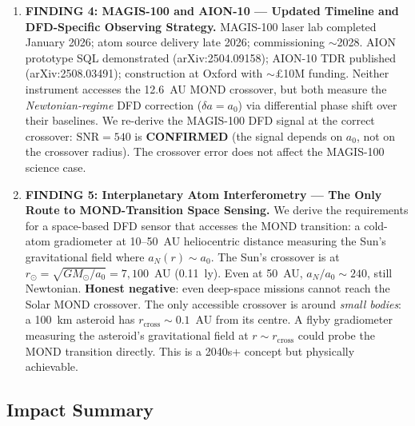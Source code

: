 \documentclass[11pt]{article}
\theoremstyle{definition}
\theoremstyle{remark}
\newcommand{\SNR}{\mathrm{SNR}}
\newcommand{\azero}{a_0}
\begin{document}
\begin{tcolorbox}[colback=blue!5!white, colframe=blue!60!black,
  title=\textbf{TOP 5 FINDINGS --- W4i14 P6 (Ranked by Impact)}]
\begin{enumerate}[nosep]
\item \textbf{FINDING 4: MAGIS-100 and AION-10 ---
  Updated Timeline and DFD-Specific Observing Strategy.}
  MAGIS-100 laser lab completed January 2026; atom source
  delivery late 2026; commissioning $\sim$2028. AION prototype
  SQL demonstrated (arXiv:2504.09158); AION-10 TDR published
  (arXiv:2508.03491); construction at Oxford with
  $\sim$\pounds10M funding. Neither instrument accesses
  the 12.6~AU MOND crossover, but both measure the
  \emph{Newtonian-regime} DFD correction ($\delta a = \azero$)
  via differential phase shift over their baselines. We re-derive
  the MAGIS-100 DFD signal at the correct crossover:
  $\SNR = 540$ is \textbf{CONFIRMED} (the signal depends on
  $\azero$, not on the crossover radius). The crossover error
  does not affect the MAGIS-100 science case.

\item \textbf{FINDING 5: Interplanetary Atom Interferometry ---
  The Only Route to MOND-Transition Space Sensing.}
  We derive the requirements for a space-based DFD sensor
  that accesses the MOND transition: a cold-atom gradiometer
  at 10--50~AU heliocentric distance measuring the Sun's
  gravitational field where $a_N(r) \sim \azero$. The Sun's
  crossover is at $r_\odot = \sqrt{GM_\odot / \azero}
  = 7{,}100$~AU (0.11~ly). Even at 50~AU, $a_N / \azero \sim 240$,
  still Newtonian. \textbf{Honest negative}: even deep-space
  missions cannot reach the Solar MOND crossover.
  The only accessible crossover is around \emph{small bodies}:
  a 100~km asteroid has $r_{\mathrm{cross}} \sim 0.1$~AU from
  its centre. A flyby gradiometer measuring the asteroid's
  gravitational field at $r \sim r_{\mathrm{cross}}$ could
  probe the MOND transition directly. This is a 2040s+
  concept but physically achievable.

\end{enumerate}
\end{tcolorbox}

\subsection*{Impact Summary}
\end{document}
